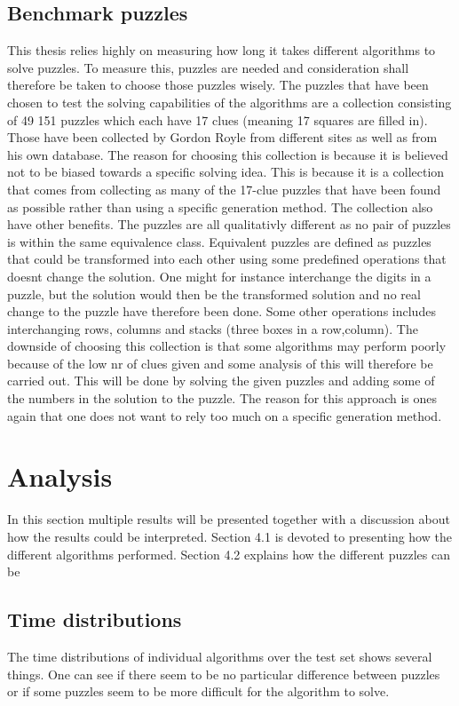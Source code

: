 \documentclass[a4paper,11pt]{kth-mag}
\begin{document}
\section{Benchmark puzzles}
This thesis relies highly on measuring how long it takes different algorithms to solve puzzles. 
To measure this, puzzles are needed and consideration shall therefore be taken to choose those puzzles wisely.
The puzzles that have been chosen to test the solving capabilities of the algorithms are a collection consisting of 49 151 puzzles which each have 17 clues (meaning 17 squares are filled in). \cite{database} Those have been collected by Gordon Royle from different sites as well as from his own database.
The reason for choosing this collection is because it is believed not to be biased towards a specific solving idea.
This is because it is a collection that comes from collecting as many of the 17-clue puzzles that have been found as possible rather than using a specific generation method.
The collection also have other benefits.
The puzzles are all qualitativly different as no pair of puzzles is within the same equivalence class.
Equivalent puzzles are defined as puzzles that could be transformed into each other using some predefined operations that doesnt change the solution.
One might for instance interchange the digits in a puzzle, but the solution would then be the transformed solution and no real change to the puzzle have therefore been done.
Some other operations includes interchanging rows, columns and stacks (three boxes in a row,column).
The downside of choosing this collection is that some algorithms may perform poorly because of the low nr of clues given and some analysis of this will therefore be carried out.
This will be done by solving the given puzzles and adding some of the numbers in the solution to the puzzle.
The reason for this approach is ones again that one does not want to rely too much on a specific generation method.

\chapter{Analysis}
In this section multiple results will be presented together with a discussion about how the results could be interpreted. 
Section 4.1 is devoted to presenting how the different algorithms performed. 
Section 4.2 explains how the different puzzles can be  

\section{Time distributions}
The time distributions of individual algorithms over the test set shows several things.
One can see if there seem to be no particular difference between puzzles or if some puzzles seem to be more difficult for the algorithm to solve.
\end{document}
